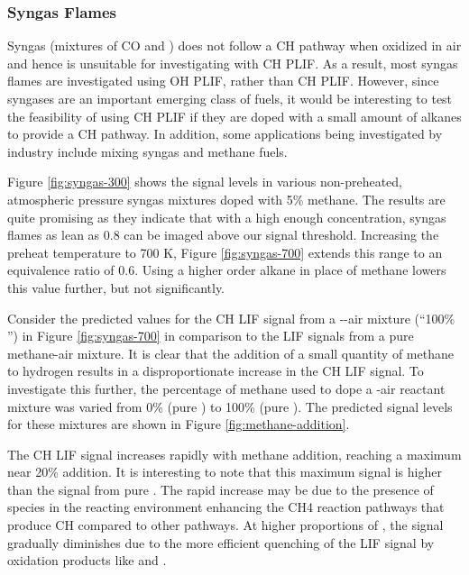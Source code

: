 \subsubsection{Syngas Flames}

Syngas (mixtures of CO and ) does not follow a CH pathway when oxidized in air and hence is unsuitable for investigating with CH PLIF.
As a result, most syngas flames are investigated using OH PLIF, rather than CH PLIF.
However, since syngases are an important emerging class of fuels, it would be interesting to test the feasibility of using CH PLIF if they are doped with a small amount of alkanes to provide a CH pathway.
In addition, some applications being investigated by industry include mixing syngas and methane fuels.

Figure \ref{fig:syngas-300} shows the signal levels in various non-preheated, atmospheric pressure syngas mixtures doped with 5\% methane.
The results are quite promising as they indicate that with a high enough  concentration, syngas flames as lean as 0.8 can be imaged above our signal threshold.
Increasing the preheat temperature to 700 K, Figure \ref{fig:syngas-700} extends this range to an equivalence ratio of 0.6.
Using a higher order alkane in place of methane lowers this value further, but not significantly.




Consider the predicted values for the CH LIF signal from a --air mixture (``100\% '') in Figure \ref{fig:syngas-700} in comparison to the LIF signals from a pure methane-air mixture.
It is clear that the addition of a small quantity of methane to hydrogen results in a disproportionate increase in the CH LIF signal.
To investigate this further, the percentage of methane used to dope a -air reactant mixture was varied from 0\% (pure ) to 100\% (pure ).
The predicted signal levels for these mixtures are shown in Figure \ref{fig:methane-addition}.



The CH LIF signal increases rapidly with methane addition, reaching a maximum near 20\%  addition.
It is interesting to note that this maximum signal is higher than the signal from pure .
The rapid increase may be due to the presence of  species in the reacting environment enhancing the CH4 reaction pathways that produce CH compared to other pathways.
At higher proportions of , the signal gradually diminishes due to the more efficient quenching of the LIF signal by  oxidation products like  and .

